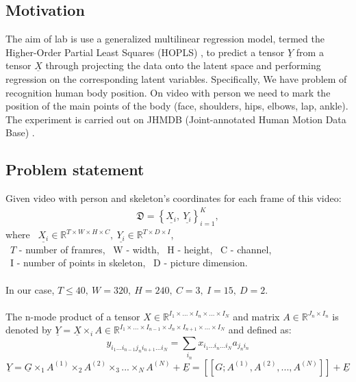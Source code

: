 \documentclass[../../main.tex]{subfiles}
\begin{document}
\subsection{Motivation}

The aim of lab is use a generalized multilinear regression model, termed the Higher-Order Partial Least Squares (HOPLS) \cite{zhao2012higher}, to predict a tensor $\underline{Y}$ from a tensor $\underline{X}$ through projecting the data onto the latent space and performing regression on the corresponding latent variables. Specifically, We have problem of recognition human body position. On video with person we need to mark the position of the main points of the body (face, shoulders, hips, elbows, lap, ankle). The experiment is carried out on JHMDB (Joint-annotated Human Motion Data Base) \cite{Jhuang:ICCV:2013}.

\subsection{Problem statement}

Given video with person and skeleton's coordinates for each frame of this video:
\[
\label{eq:example:1}
\begin{aligned}
    \mathfrak{D} = \left\{\underline{X_i}, ~\underline{Y_i}\right\}_{i=1}^{K},
\end{aligned}
\]
where ~$\underline{X_i} \in \mathbb{R}^{T \times W\times H\times C}, ~\underline{Y_i} \in \mathbb{R}^{T \times D \times I}$,\\ 
~$T$ - number of framres,  ~{W} - width, ~{H} - height, ~{C} - channel,\\ ~{I} - number of points in skeleton, ~{D} - picture dimension.\\
\\
In our case, $T \leqslant 40, ~W = 320, ~H = 240, ~C = 3, ~I = 15, ~D = 2.$\\
\\
The n-mode product of a tensor
$ X \in \mathbb{R}^{I_1\times ... \times I_n \times ... \times I_N}$
and matrix $A \in \mathbb{R}^{J_n\times I_n}$
is denoted by $\underline{Y} = \underline{X} \times_{i}A \in \mathbb{R}^{I_1\times ... \times I_{n-1} \times J_n \times I_{n+1} \times ... \times I_N}$
and defined as:
$$y_{i_1...i_{n-1}j_ni_{n+1}...i_N } = \sum_{i_n} x_{i_1...i_n...i_N }a_{j_ni_n}$$
$$\underline{Y} = \underline{G} \times_{1} A^{(1)} \times_{2} A^{(2)} \times_{3} ...\times_{N} A^{(N)} + \underline{E} = [[G; A^{(1)}, A^{(2)}, ..., A^{(N)}]] + \underline{E}$$
\end{document}
